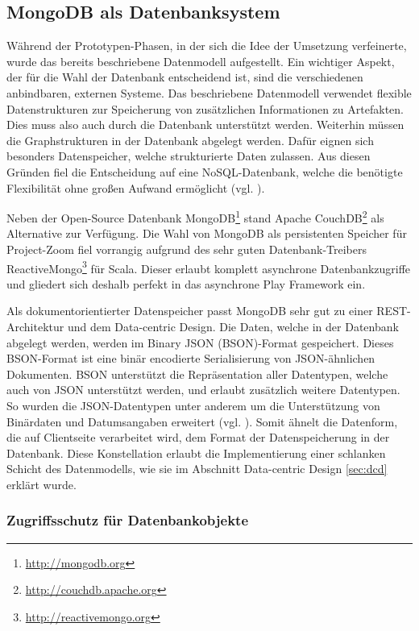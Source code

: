 \subsection{MongoDB als Datenbanksystem}
Während der Prototypen-Phasen, in der sich die Idee der Umsetzung verfeinerte, wurde das bereits beschriebene Datenmodell aufgestellt. Ein wichtiger Aspekt, der für die Wahl der Datenbank entscheidend ist, sind die verschiedenen anbindbaren, externen Systeme. Das beschriebene Datenmodell verwendet flexible Datenstrukturen zur Speicherung von zusätzlichen Informationen zu Artefakten. Dies muss also auch durch die Datenbank unterstützt werden. Weiterhin müssen die Graphstrukturen in der Datenbank abgelegt werden. Dafür eignen sich besonders Datenspeicher, welche strukturierte Daten zulassen. Aus diesen Gründen fiel die Entscheidung auf eine NoSQL-Datenbank, welche die benötigte Flexibilität ohne großen Aufwand ermöglicht (vgl. \cite{mysgl-to-nosql}).

Neben der Open-Source Datenbank MongoDB\footnote{\url{http://mongodb.org}} stand Apache CouchDB\footnote{\url{http://couchdb.apache.org}} als Alternative zur Verfügung. Die Wahl von MongoDB als persistenten Speicher für Project-Zoom fiel vorrangig aufgrund des sehr guten Datenbank-Treibers ReactiveMongo\footnote{\url{http://reactivemongo.org}} für Scala. Dieser erlaubt komplett asynchrone Datenbankzugriffe und gliedert sich deshalb perfekt in das asynchrone Play Framework ein.

Als dokumentorientierter Datenspeicher passt MongoDB sehr gut zu einer REST-Architektur und dem Data-centric Design. Die Daten, welche in der Datenbank abgelegt werden, werden im Binary JSON (BSON)-Format gespeichert. Dieses BSON-Format ist eine binär encodierte Serialisierung von JSON-ähnlichen Dokumenten. BSON unterstützt die Repräsentation aller Datentypen, welche auch von JSON unterstützt werden, und erlaubt zusätzlich weitere Datentypen. So wurden die JSON-Datentypen unter anderem um die Unterstützung von Binärdaten und Datumsangaben erweitert (vgl. \cite{bson}). Somit ähnelt die Datenform, die auf Clientseite verarbeitet wird, dem Format der Datenspeicherung in der Datenbank. Diese Konstellation erlaubt die Implementierung einer schlanken Schicht des Datenmodells, wie sie im Abschnitt Data-centric Design \ref{sec:dcd} erklärt wurde.

\subsubsection{Zugriffsschutz für Datenbankobjekte}

